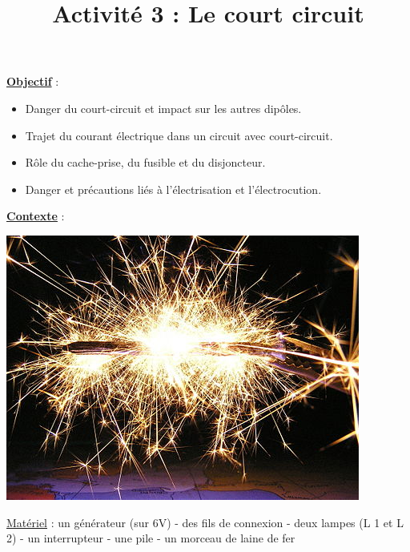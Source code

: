 \documentclass[10pt]{article}
\newcommand{\titreActivite}{Activité 3 : Le court circuit} %
\newcommand{\objectif}{ 	
	
	\begin{itemize}
		\item Danger du court-circuit et impact sur les autres dipôles.
		\item Trajet du courant électrique dans un circuit avec court-circuit.
		\item Rôle du cache-prise, du fusible et du disjoncteur.
		\item Danger et précautions liés à l'électrisation et l'électrocution.
	\end{itemize}
} %
\newcommand{\contexte}{
}
\newcommand{\resumeContexte}{
	} %
\begin{document}
\date{}
\title{\titreActivite}
\maketitle %


\underline{\textbf{Objectif}} :  \vspace{2pt}
\objectif

\vspace{4pt}

\underline{\textbf{Contexte}} :  \textit{\contexte}

\begin{center}
	\includegraphics[width=0.55\columnwidth]{activité.jpg} %
\end{center}

\textbf{\resumeContexte}
\vspace{-12pt}


\underline{Matériel} : un générateur (sur 6V) - des fils de connexion - deux lampes (L 1 et L 2) - un interrupteur - une
pile - un morceau de laine de fer

\end{document}
